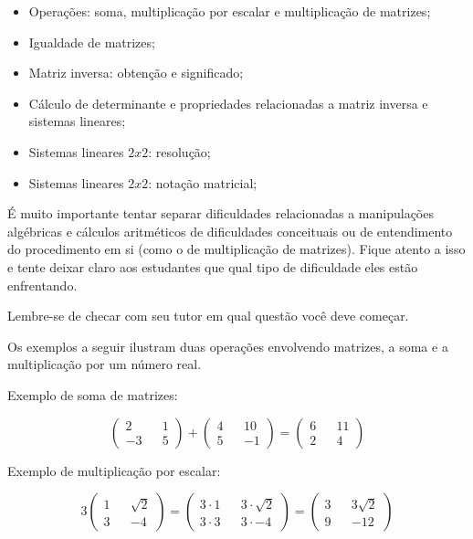 \documentclass[main_estudante.tex]{subfiles}
\begin{document}
\begin{itemize}
 \item Operações: soma, multiplicação por escalar e multiplicação de matrizes;
 \item Igualdade de matrizes;
 \item Matriz inversa: obtenção e significado;
 \item Cálculo de determinante e propriedades relacionadas a matriz inversa e sistemas lineares;
 \item Sistemas lineares $2x2$: resolução;
 \item Sistemas lineares $2x2$: notação matricial;
\end{itemize}

É muito importante tentar separar dificuldades relacionadas a manipulações algébricas e cálculos aritméticos de dificuldades conceituais ou de entendimento do procedimento em si (como o de multiplicação de matrizes). Fique atento a isso e tente deixar claro aos estudantes que qual tipo de dificuldade eles estão enfrentando.

\paraAmbos

Lembre-se de checar com seu tutor em qual questão você deve começar.

Os exemplos a seguir ilustram duas operações envolvendo matrizes, a soma e a multiplicação por um número real.

\begin{caixaExemplo}
	Exemplo de soma de matrizes:

  $$\begin{pmatrix} 2 && 1 \\ -3 && 5 \end{pmatrix} + \begin{pmatrix} 4 && 10 \\ 5 && -1 \end{pmatrix} = \begin{pmatrix} 6 && 11 \\ 2 && 4  \end{pmatrix}$$
\end{caixaExemplo} 	

\begin{caixaExemplo}
	Exemplo de multiplicação por escalar:
 
 $$3 \begin{pmatrix} 1 && \sqrt{2} \\ 3 && -4 \end{pmatrix} = \begin{pmatrix} 3 \cdot 1 && 3 \cdot \sqrt{2} \\ 3 \cdot 3 && 3 \cdot -4 \end{pmatrix} = \begin{pmatrix} 3 && 3 \sqrt{2} \\ 9 && -12 \end{pmatrix}$$
\end{caixaExemplo}
\end{document}
